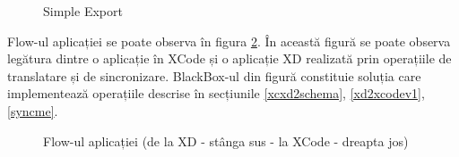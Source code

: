 \begin{figure}[!htbp]
\centering
{}
\caption{Simple Export} \label{fig:Export}
\end{figure}

Flow-ul aplicației se poate observa în figura \ref{fig:Prezentare}. În această figură se poate observa legătura dintre o aplicație în XCode și o aplicație XD realizată prin operațiile de translatare și de sincronizare. BlackBox-ul din figură constituie soluția care implementează operațiile descrise în secțiunile \ref{xcxd2schema}, \ref{xd2xcodev1}, \ref{syncme}.

\begin{figure}[!htbp]
\centering
{}
\caption{Flow-ul aplicației (de la XD - stânga sus - la XCode - dreapta jos)} \label{fig:Prezentare}
\end{figure}


